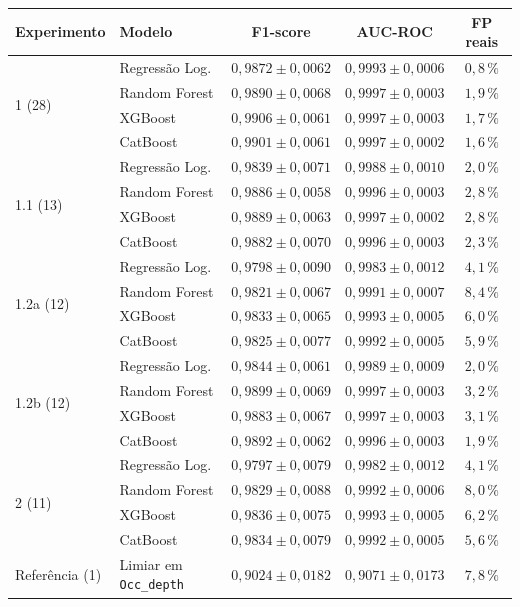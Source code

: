 \documentclass[msc]{on} %
\providecommand{\DIFaddendFL}{} %
\begin{document}
\begin{table}[htbp]
\footnotesize
\begin{tabular}{llccc}
\hline
\textbf{Experimento} & \textbf{Modelo} & \textbf{F1-score} & \textbf{AUC-ROC} & \textbf{FP reais} \\
\hline
\multirow{4}{*}{1 (28)} & Regressão Log. & $0{,}9872 \pm 0{,}0062$ & $0{,}9993 \pm 0{,}0006$ & $0{,}8\,\%$ \\
 & Random Forest & $0{,}9890 \pm 0{,}0068$ & $0{,}9997 \pm 0{,}0003$ & $1{,}9\,\%$ \\
 & XGBoost & $0{,}9906 \pm 0{,}0061$ & $0{,}9997 \pm 0{,}0003$ & $1{,}7\,\%$ \\
 & CatBoost & $0{,}9901 \pm 0{,}0061$ & $0{,}9997 \pm 0{,}0002$ & $1{,}6\,\%$ \\
\hline
\multirow{4}{*}{1.1 (13)} & Regressão Log. & $0{,}9839 \pm 0{,}0071$ & $0{,}9988 \pm 0{,}0010$ & $2{,}0\,\%$ \\
 & Random Forest & $0{,}9886 \pm 0{,}0058$ & $0{,}9996 \pm 0{,}0003$ & $2{,}8\,\%$ \\
 & XGBoost & $0{,}9889 \pm 0{,}0063$ & $0{,}9997 \pm 0{,}0002$ & $2{,}8\,\%$ \\
 & CatBoost & $0{,}9882 \pm 0{,}0070$ & $0{,}9996 \pm 0{,}0003$ & $2{,}3\,\%$ \\
\hline
\multirow{4}{*}{1.2a (12)} & Regressão Log. & $0{,}9798 \pm 0{,}0090$ & $0{,}9983 \pm 0{,}0012$ & $4{,}1\,\%$ \\
 & Random Forest & $0{,}9821 \pm 0{,}0067$ & $0{,}9991 \pm 0{,}0007$ & $8{,}4\,\%$ \\
 & XGBoost & $0{,}9833 \pm 0{,}0065$ & $0{,}9993 \pm 0{,}0005$ & $6{,}0\,\%$ \\
 & CatBoost & $0{,}9825 \pm 0{,}0077$ & $0{,}9992 \pm 0{,}0005$ & $5{,}9\,\%$ \\
\hline
\multirow{4}{*}{1.2b (12)} & Regressão Log. & $0{,}9844 \pm 0{,}0061$ & $0{,}9989 \pm 0{,}0009$ & $2{,}0\,\%$ \\
 & Random Forest & $0{,}9899 \pm 0{,}0069$ & $0{,}9997 \pm 0{,}0003$ & $3{,}2\,\%$ \\
 & XGBoost & $0{,}9883 \pm 0{,}0067$ & $0{,}9997 \pm 0{,}0003$ & $3{,}1\,\%$ \\
 & CatBoost & $0{,}9892 \pm 0{,}0062$ & $0{,}9996 \pm 0{,}0003$ & $1{,}9\,\%$ \\
\hline
\multirow{4}{*}{2 (11)} & Regressão Log. & $0{,}9797 \pm 0{,}0079$ & $0{,}9982 \pm 0{,}0012$ & $4{,}1\,\%$ \\
 & Random Forest & $0{,}9829 \pm 0{,}0088$ & $0{,}9992 \pm 0{,}0006$ & $8{,}0\,\%$ \\
 & XGBoost & $0{,}9836 \pm 0{,}0075$ & $0{,}9993 \pm 0{,}0005$ & $6{,}2\,\%$ \\
 & CatBoost & $0{,}9834 \pm 0{,}0079$ & $0{,}9992 \pm 0{,}0005$ & $5{,}6\,\%$ \\
\hline
Referência (1) & Limiar em \texttt{Occ\_depth} & $0{,}9024 \pm 0{,}0182$ & $0{,}9071 \pm 0{,}0173$ & $7{,}8\,\%$ \\
\hline
\end{tabular}
\DIFaddendFL \end{table}
\end{document}
